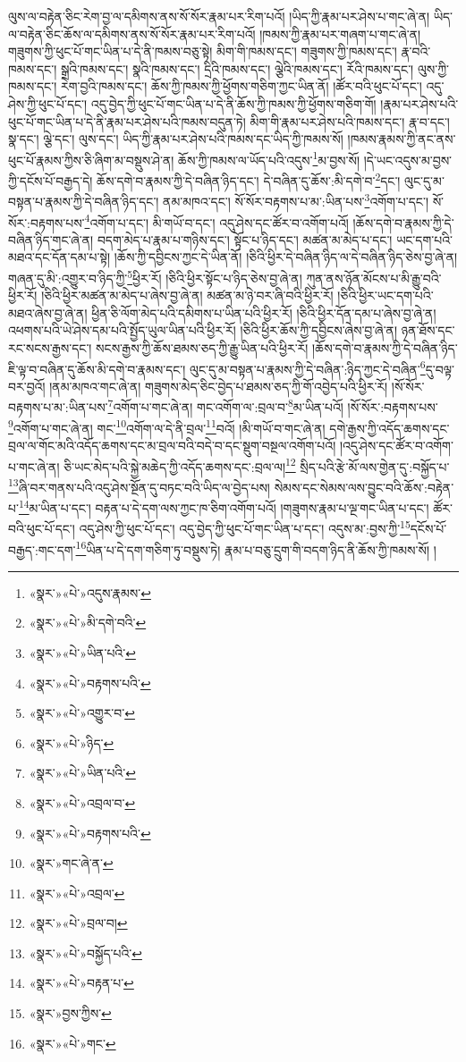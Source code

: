 ལུས་ལ་བརྟེན་ཅིང་རེག་བྱ་ལ་དམིགས་ནས་སོ་སོར་རྣམ་པར་རིག་པའོ། །ཡིད་ཀྱི་རྣམ་པར་ཤེས་པ་གང་ཞེ་ན། ཡིད་ལ་བརྟེན་ཅིང་ཆོས་ལ་དམིགས་ནས་སོ་སོར་རྣམ་པར་རིག་པའོ། །ཁམས་ཀྱི་རྣམ་པར་གཞག་པ་གང་ཞེ་ན། གཟུགས་ཀྱི་ཕུང་པོ་གང་ཡིན་པ་དེ་ནི་ཁམས་བཅུ་སྟེ། མིག་གི་ཁམས་དང་། གཟུགས་ཀྱི་ཁམས་དང་། རྣ་བའི་ཁམས་དང་། སྒྲའི་ཁམས་དང་། སྣའི་ཁམས་དང་། དྲིའི་ཁམས་དང་། ལྕེའི་ཁམས་དང་། རོའི་ཁམས་དང་། ལུས་ཀྱི་ཁམས་དང་། རེག་བྱའི་ཁམས་དང་། ཆོས་ཀྱི་ཁམས་ཀྱི་ཕྱོགས་གཅིག་ཀྱང་ཡིན་ནོ། །ཚོར་བའི་ཕུང་པོ་དང་། འདུ་ཤེས་ཀྱི་ཕུང་པོ་དང་། འདུ་བྱེད་ཀྱི་ཕུང་པོ་གང་ཡིན་པ་དེ་ནི་ཆོས་ཀྱི་ཁམས་ཀྱི་ཕྱོགས་གཅིག་གོ། །རྣམ་པར་ཤེས་པའི་ཕུང་པོ་གང་ཡིན་པ་དེ་ནི་རྣམ་པར་ཤེས་པའི་ཁམས་བདུན་ཏེ། མིག་གི་རྣམ་པར་ཤེས་པའི་ཁམས་དང་། རྣ་བ་དང་། སྣ་དང་། ལྕེ་དང་། ལུས་དང་། ཡིད་ཀྱི་རྣམ་པར་ཤེས་པའི་ཁམས་དང་ཡིད་ཀྱི་ཁམས་སོ། །ཁམས་རྣམས་ཀྱི་ནང་ནས་ཕུང་པོ་རྣམས་ཀྱིས་ཅི་ཞིག་མ་བསྡུས་ཤེ་ན། ཆོས་ཀྱི་ཁམས་ལ་ཡོད་པའི་འདུས་\footnote{«སྣར་»«པེ་»འདུས་རྣམས་}མ་བྱས་སོ། །དེ་ཡང་འདུས་མ་བྱས་ཀྱི་དངོས་པོ་བརྒྱད་དེ། ཆོས་དགེ་བ་རྣམས་ཀྱི་དེ་བཞིན་ཉིད་དང་། དེ་བཞིན་དུ་ཆོས་:མི་དགེ་བ་\footnote{«སྣར་»«པེ་»མི་དགེ་བའི་}དང་། ལུང་དུ་མ་བསྟན་པ་རྣམས་ཀྱི་དེ་བཞིན་ཉིད་དང་། ནམ་མཁའ་དང་། སོ་སོར་བརྟགས་པ་མ་:ཡིན་པས་\footnote{«སྣར་»«པེ་»ཡིན་པའི་}འགོག་པ་དང་། སོ་སོར་:བརྟགས་པས་\footnote{«སྣར་»«པེ་»བརྟགས་པའི་}འགོག་པ་དང་། མི་གཡོ་བ་དང་། འདུ་ཤེས་དང་ཚོར་བ་འགོག་པའོ། །ཆོས་དགེ་བ་རྣམས་ཀྱི་དེ་བཞིན་ཉིད་གང་ཞེ་ན། བདག་མེད་པ་རྣམ་པ་གཉིས་དང་། སྟོང་པ་ཉིད་དང་། མཚན་མ་མེད་པ་དང་། ཡང་དག་པའི་མཐའ་དང་དོན་དམ་པ་སྟེ། །ཆོས་ཀྱི་དབྱིངས་ཀྱང་དེ་ཡིན་ནོ། །ཅིའི་ཕྱིར་དེ་བཞིན་ཉིད་ལ་དེ་བཞིན་ཉིད་ཅེས་བྱ་ཞེ་ན། གཞན་དུ་མི་:འགྱུར་བ་ཉིད་ཀྱི་\footnote{«སྣར་»«པེ་»འགྱུར་བ་}ཕྱིར་རོ། །ཅིའི་ཕྱིར་སྟོང་པ་ཉིད་ཅེས་བྱ་ཞེ་ན། ཀུན་ནས་ཉོན་མོངས་པ་མི་རྒྱུ་བའི་ཕྱིར་རོ། །ཅིའི་ཕྱིར་མཚན་མ་མེད་པ་ཞེས་བྱ་ཞེ་ན། མཚན་མ་ཉེ་བར་ཞི་བའི་ཕྱིར་རོ། །ཅིའི་ཕྱིར་ཡང་དག་པའི་མཐའ་ཞེས་བྱ་ཞེ་ན། ཕྱིན་ཅི་ལོག་མེད་པའི་དམིགས་པ་ཡིན་པའི་ཕྱིར་རོ། །ཅིའི་ཕྱིར་དོན་དམ་པ་ཞེས་བྱ་ཞེ་ན། འཕགས་པའི་ཡེ་ཤེས་དམ་པའི་སྤྱོད་ཡུལ་ཡིན་པའི་ཕྱིར་རོ། །ཅིའི་ཕྱིར་ཆོས་ཀྱི་དབྱིངས་ཞེས་བྱ་ཞེ་ན། ཉན་ཐོས་དང་རང་སངས་རྒྱས་དང་། སངས་རྒྱས་ཀྱི་ཆོས་ཐམས་ཅད་ཀྱི་རྒྱུ་ཡིན་པའི་ཕྱིར་རོ། །ཆོས་དགེ་བ་རྣམས་ཀྱི་དེ་བཞིན་ཉིད་ཇི་ལྟ་བ་བཞིན་དུ་ཆོས་མི་དགེ་བ་རྣམས་དང་། ལུང་དུ་མ་བསྟན་པ་རྣམས་ཀྱི་དེ་བཞིན་:ཉིད་ཀྱང་དེ་བཞིན་\footnote{«སྣར་»«པེ་»ཉིད་}དུ་བལྟ་བར་བྱའོ། །ནམ་མཁའ་གང་ཞེ་ན། གཟུགས་མེད་ཅིང་བྱེད་པ་ཐམས་ཅད་ཀྱི་གོ་འབྱེད་པའི་ཕྱིར་རོ། །སོ་སོར་བརྟགས་པ་མ་:ཡིན་པས་\footnote{«སྣར་»«པེ་»ཡིན་པའི་}འགོག་པ་གང་ཞེ་ན། གང་འགོག་ལ་:བྲལ་བ་\footnote{«སྣར་»«པེ་»འབྲལ་བ་}མ་ཡིན་པའོ། །སོ་སོར་:བརྟགས་པས་\footnote{«སྣར་»«པེ་»བརྟགས་པའི་}འགོག་པ་གང་ཞེ་ན། གང་\footnote{«སྣར་»གང་ཞེ་ན་}འགོག་ལ་དེ་ནི་བྲལ་\footnote{«སྣར་»«པེ་»འབྲལ་}བའོ། །མི་གཡོ་བ་གང་ཞེ་ན། དགེ་རྒྱས་ཀྱི་འདོད་ཆགས་དང་བྲལ་ལ་གོང་མའི་འདོད་ཆགས་དང་མ་བྲལ་བའི་བདེ་བ་དང་སྡུག་བསྔལ་འགོག་པའོ། །འདུ་ཤེས་དང་ཚོར་བ་འགོག་པ་གང་ཞེ་ན། ཅི་ཡང་མེད་པའི་སྐྱེ་མཆེད་ཀྱི་འདོད་ཆགས་དང་:བྲལ་ལ།\footnote{«སྣར་»«པེ་»བྲལ་བ།} སྲིད་པའི་རྩེ་མོ་ལས་གྱེན་དུ་:བསྐྱོད་པ་\footnote{«སྣར་»«པེ་»བསྐྱོད་པའི་}ཞི་བར་གནས་པའི་འདུ་ཤེས་སྔོན་དུ་བཏང་བའི་ཡིད་ལ་བྱེད་པས། སེམས་དང་སེམས་ལས་བྱུང་བའི་ཆོས་:བརྟེན་པ་\footnote{«སྣར་»«པེ་»བརྟན་པ་}མ་ཡིན་པ་དང་། བརྟན་པ་དེ་དག་ལས་ཀྱང་ཁ་ཅིག་འགོག་པའོ། །གཟུགས་རྣམ་པ་ལྔ་གང་ཡིན་པ་དང་། ཚོར་བའི་ཕུང་པོ་དང་། འདུ་ཤེས་ཀྱི་ཕུང་པོ་དང་། འདུ་བྱེད་ཀྱི་ཕུང་པོ་གང་ཡིན་པ་དང་། འདུས་མ་:བྱས་ཀྱི་\footnote{«སྣར་»བྱས་ཀྱིས་}དངོས་པོ་བརྒྱད་:གང་དག་\footnote{«སྣར་»«པེ་»གང་}ཡིན་པ་དེ་དག་གཅིག་ཏུ་བསྡུས་ཏེ། རྣམ་པ་བཅུ་དྲུག་གི་བདག་ཉིད་ནི་ཆོས་ཀྱི་ཁམས་སོ། །
